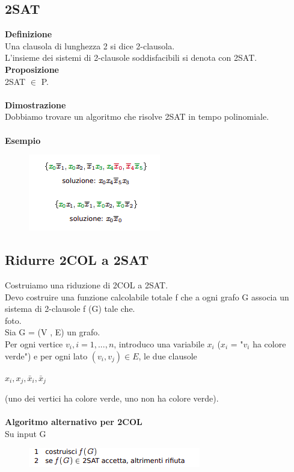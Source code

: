 \subsection{2SAT}
\textbf{Definizione}\\
Una clausola di lunghezza 2 si dice 2-clausola.\\
L’insieme dei sistemi di 2-clausole soddisfacibili si denota con 2SAT.\\
\textbf{Proposizione}\\
2SAT $\in$ P.\\\\
\textbf{Dimostrazione}\\
Dobbiamo trovare un algoritmo che risolve 2SAT in tempo polinomiale.\\\\
\textbf{Esempio}\\
\begin{figure}[htp]
    \centering
    \includegraphics[scale=0.9]{tesi_stile/img/foto3cap10.png}
\end{figure}
\newpage
\subsection{Ridurre 2COL a 2SAT}
Costruiamo una riduzione di 2COL a 2SAT.\\
Devo costruire una funzione calcolabile totale f che a ogni grafo G associa un sistema di 2-clausole f (G) tale che.\\
foto.\\
Sia G = (V , E) un grafo.\\
Per ogni vertice $v_i,i = 1, . . . , n$, introduco una variabile $x_i$ ($x_i$ = "$v_i$ ha colore verde") e per ogni lato $(v_i, v_j) \in E$, le due clausole
\begin{center}
    $x_i, x_j, \bar{x}_i, \bar{x}_j$
\end{center}
(uno dei vertici ha colore verde, uno non ha colore verde).\\\\
\textbf{Algoritmo alternativo per 2COL}\\
Su input G
\begin{figure}[htp]
    \includegraphics[scale=0.9]{tesi_stile/img/foto4cap10.png}
\end{figure}
\newpage

